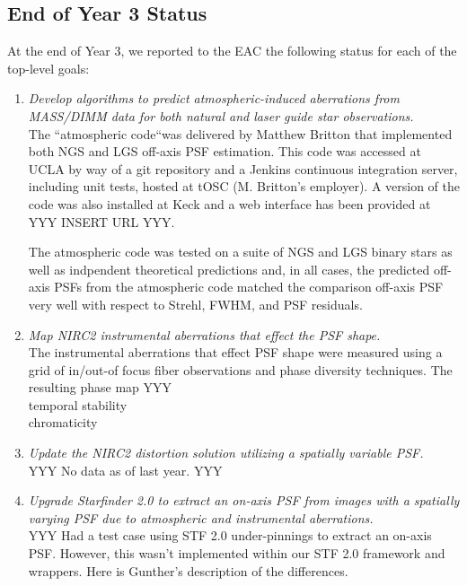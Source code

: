\subsection{End of Year 3 Status}
At the end of Year 3, we reported to the EAC the following status for
each of the top-level goals:
\begin{enumerate}
\item {\em Develop algorithms to predict atmospheric-induced aberrations
  from MASS/DIMM data for both natural and laser guide star
  observations.} \\
  The ``atmospheric code``was delivered by Matthew Britton that
  implemented both NGS and LGS off-axis PSF estimation. This code was
  accessed at UCLA by way of a git repository and a Jenkins continuous
  integration server, including unit tests, hosted at tOSC
  (M. Britton's employer). A version of the code was also installed at
  Keck and a web interface has been provided at YYY INSERT URL YYY.

  The atmospheric code was tested on a suite of NGS and LGS
  binary stars as well as indpendent theoretical predictions and, in
  all cases, the predicted off-axis PSFs from the atmospheric code
  matched the comparison off-axis PSF very well with respect to
  Strehl, FWHM, and PSF residuals. 

\item {\em Map NIRC2 instrumental aberrations that effect the PSF
    shape.} \\
  The instrumental aberrations that effect PSF shape were
  measured using a grid of in/out-of focus fiber observations and
  phase diversity techniques. The resulting phase map YYY \\
  temporal stability \\
  chromaticity 
  
\item {\em Update the NIRC2 distortion solution utilizing a spatially
  variable PSF.} \\
  YYY No data as of last year. YYY

\item {\em Upgrade Starfinder 2.0 to extract an on-axis PSF from images with
  a spatially varying PSF due to atmospheric and instrumental
  aberrations.} \\
  YYY Had a test case using STF 2.0 under-pinnings to extract an
  on-axis PSF. However, this wasn't implemented within our STF 2.0
  framework and wrappers. Here is Gunther's description of the
  differences. 


\end{enumerate}

